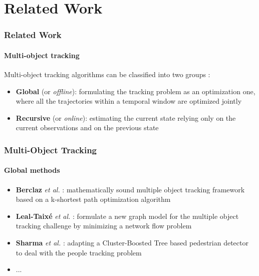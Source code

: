 \section{Related Work}

\begin{frame}
	\frametitle{Related Work}
	\framesubtitle{Multi-object tracking}
	
	\Large
	
	\vspace{0.4cm}
	
	Multi-object tracking algorithms can be classified into two groups \cite{Andriyenko11}:
	
	\vspace{0.2cm}
	
	\begin{itemize}
		\item \textbf{Global} (or \emph{offline}): formulating the tracking problem as an
			  optimization one, where all the trajectories within a temporal window are
			  optimized jointly
		\item \textbf{Recursive} (or \emph{online}): estimating the current state relying
			  only on the current observations and on the previous state
	\end{itemize}
\end{frame}

\begin{frame}
	\frametitle{Multi-Object Tracking}
	\framesubtitle{Global methods}
	
	\Large
	
	\vspace{0.2cm}
	
	\begin{itemize}
		\item \textbf{Berclaz} \emph{et al.} \cite{Berclaz11}: mathematically sound
			  multiple object tracking framework based on a k-shortest path optimization
			  algorithm
		\vspace{0.1cm}
		\item \textbf{Leal-Taix{\'e}} \emph{et al.} \cite{Leal11}: formulate a new graph
			  model for the multiple object tracking challenge by minimizing a network flow
			  problem
		\vspace{0.1cm}
		\item \textbf{Sharma} \emph{et al.} \cite{Sharma09}: adapting a Cluster-Boosted
			  Tree based pedestrian detector to deal with the people tracking problem
		\vspace{0.1cm}
		\item ...
	\end{itemize}
\end{frame}

